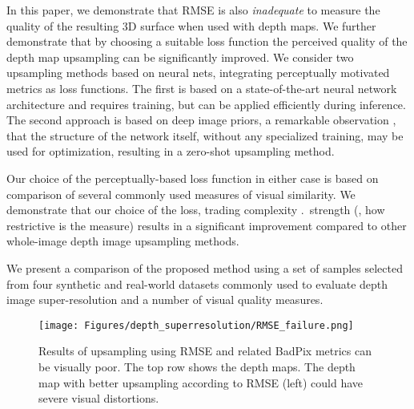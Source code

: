 In this paper, we demonstrate that RMSE is also \emph{inadequate} to measure the quality of the resulting 3D surface when used with depth maps.
We further demonstrate that by choosing a suitable loss function the perceived quality of the depth map upsampling can be significantly improved. We consider two upsampling methods based on neural nets, integrating perceptually motivated metrics as loss functions. The first is based on a state-of-the-art neural network architecture and requires training, but can be applied efficiently during inference.
The second approach is based on deep image priors, a remarkable observation \cite{Ulyanov_2018_CVPR}, that the structure of the network itself, without any specialized training, may be used for optimization, resulting in a zero-shot upsampling method.

Our choice of the perceptually-based loss function in either case is based on comparison of several commonly used measures of visual similarity.  We demonstrate that our choice of the loss, trading complexity \vs.\ strength (\ie, how restrictive is the measure) results in a significant improvement compared to other whole-image depth image upsampling methods.

We present a comparison of the proposed method using a set of samples selected from four synthetic and real-world datasets commonly used to evaluate depth image super-resolution and a number of visual quality measures. 

\begingroup

\begin{figure}[t]
\begin{center}
        \texttt{[image: Figures/depth\_superresolution/RMSE\_failure.png]}

\caption{Results of upsampling using RMSE and related BadPix metrics can be visually poor. 
The top row shows the depth maps. The depth map with better upsampling  according to RMSE (left) could have severe visual distortions.
}
\label{fig:datasets}
\end{center}
\end{figure}
\endgroup



